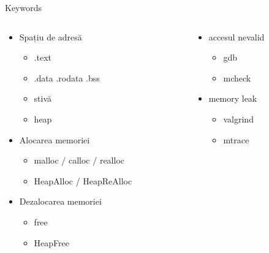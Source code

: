 \documentclass{so.cs.pub.ro}
\begin{document}
\begin{frame}{Keywords}
\begin{columns}
\begin{column}[1]{0.55\textwidth}
      \begin{itemize}
        \item Spațiu de adresă
        \begin{itemize}
          \item .text 
          \item .data .rodata .bss
          \item stivă 
          \item heap 
        \end{itemize} 
        \vspace*{0.2cm}             
        \item Alocarea memoriei
        \begin{itemize}
          \item malloc / calloc / realloc 
          \item HeapAlloc / HeapReAlloc
        \end{itemize}
        \vspace*{0.2cm}
        \item Dezalocarea memoriei
        \begin{itemize}
          \item free
          \item HeapFree
        \end{itemize}
      \end{itemize}
\end{column}
\begin{column}[1]{0.35\textwidth}
        \begin{itemize}           
          \vspace*{0.8cm}
          \item accesul nevalid
          \begin{itemize}
          \item gdb
          \item mcheck
          \end{itemize}
          \vspace{0.8cm}
          \item memory leak
          \begin{itemize}
          \item valgrind
          \item mtrace
          \end{itemize}  
          \vspace{1cm}        
        \end{itemize}
\end{column}
\end{columns}
\end{frame}
\end{document}
